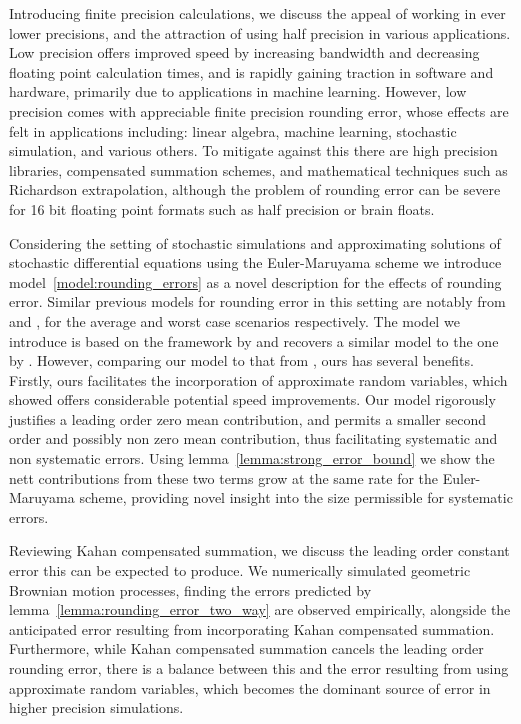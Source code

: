 \documentclass[9pt,a4paper,english]{extarticle}
\begin{document}
Introducing finite precision calculations, we discuss the appeal of working in ever lower precisions, and the attraction of using half precision in various applications. Low precision offers improved speed by increasing bandwidth and decreasing floating point calculation times, and is rapidly gaining traction in software and hardware, primarily due to applications in machine learning. However, low precision comes with appreciable finite precision rounding error, whose effects are felt in applications including: linear algebra, machine learning, stochastic simulation, and various others. To mitigate against this there are high precision libraries, compensated summation schemes, and mathematical techniques such as Richardson extrapolation, although the problem of rounding error can be severe for 16 bit floating point formats such as half precision or brain floats.

Considering the setting of stochastic simulations and approximating solutions of stochastic differential equations using the Euler-Maruyama scheme we introduce model~\ref{model:rounding_errors} as a novel description for the effects of rounding error. Similar previous models for rounding error in this setting are notably from \citet{arciniega2003rounding} and \citet{omland2016mixed}, for the average and worst case scenarios respectively. The model we introduce is based on the framework by \citet{omland2016mixed} and recovers a similar model to the one by \citet{arciniega2003rounding}. However, comparing our model to that from \citet{arciniega2003rounding}, ours has several benefits. Firstly, ours facilitates the incorporation of approximate random variables, which \citet{giles2020approximating} showed offers considerable potential speed improvements. Our model rigorously justifies a leading order zero mean contribution, and permits a smaller second order and possibly non zero mean contribution, thus facilitating systematic and non systematic errors. Using lemma~\ref{lemma:strong_error_bound} we show the nett contributions from these two terms grow at the same rate for the Euler-Maruyama scheme, providing novel insight into the size permissible for systematic errors. 

Reviewing Kahan compensated summation, we discuss the leading order constant error this can be expected to produce. We numerically simulated geometric Brownian motion processes, finding the errors predicted by lemma~\ref{lemma:rounding_error_two_way} are observed empirically, alongside the anticipated error resulting from incorporating Kahan compensated summation. Furthermore, while Kahan compensated summation cancels the leading order rounding error, there is a balance between this and the error resulting from using approximate random variables, which becomes the dominant source of error in higher precision simulations. 
\end{document}
